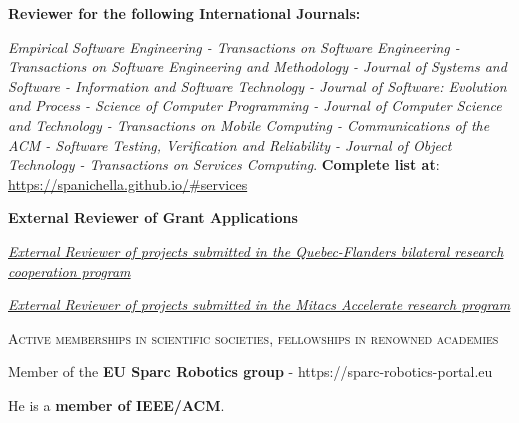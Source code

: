 \documentclass[11pt]{article}
\begin{document}
\textbf{Reviewer for the following International Journals:}
\begin{innerlist}
\item \emph{Empirical Software Engineering - Transactions on Software Engineering - Transactions on Software Engineering and Methodology - Journal of Systems and Software - Information and Software Technology - Journal of Software: Evolution and Process - Science of Computer Programming - Journal of Computer Science and Technology - Transactions on Mobile Computing - Communications of the ACM - Software Testing, Verification and Reliability - Journal of Object Technology - Transactions on Services Computing}.  \textbf{Complete list at}: \href{https://spanichella.github.io/\#services}{https://spanichella.github.io/\#services}
\end{innerlist} 

\medskip 
\textbf{External Reviewer of Grant Applications}
\begin{innerlist}
   \item \emph{
              \href{http://www.frqnt.gouv.qc.ca/accueil}
                   {External Reviewer of projects submitted in the Quebec-Flanders bilateral research cooperation program}}
\item \emph{
              \href{}
                   {External Reviewer of projects submitted in the Mitacs Accelerate research program}}
                   
\end{innerlist}


\textsc{Active memberships in scientific societies, fellowships in renowned academies}

\begin{innerlist}
\item Member of the \textbf{EU Sparc Robotics group} - https://sparc-robotics-portal.eu
\item  He is a \textbf{member of IEEE/ACM}.
\end{innerlist}
\end{document}
